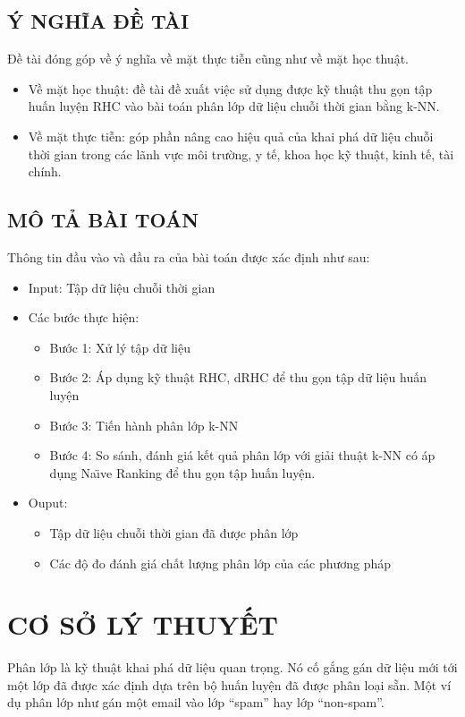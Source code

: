 \documentclass[13pt,oneside]{scrbook}
\begin{document}
\section{Ý NGHĨA ĐỀ TÀI}
Đề tài đóng góp về ý nghĩa về mặt thực tiễn cũng như về mặt học thuật.
\begin{itemize}
\item Về mặt học thuật: đề tài đề xuất việc sử dụng được kỹ thuật thu gọn tập huấn luyện RHC vào bài toán phân lớp dữ liệu chuỗi thời gian bằng k-NN.

\item Về mặt thực tiễn: góp phần nâng cao hiệu quả của khai phá dữ liệu chuỗi thời gian trong các lãnh vực môi trường, y tế, khoa học kỹ thuật, kinh tế, tài chính.
\end{itemize}

\section{MÔ TẢ BÀI TOÁN}
Thông tin đầu vào và đầu ra của bài toán được xác định như sau:
\begin{itemize}
\item Input: Tập dữ liệu chuỗi thời gian
\item Các bước thực hiện:
\begin{itemize}
\item Bước 1: Xử lý tập dữ liệu
\item Bước 2: Áp dụng kỹ thuật RHC, dRHC để thu gọn tập dữ liệu huấn luyện
\item Bước 3: Tiến hành phân lớp k-NN
\item Bước 4: So sánh, đánh giá kết quả phân lớp với giải thuật k-NN có áp dụng Na{\"\i}ve Ranking để thu gọn tập huấn luyện.
\end{itemize}
\item Ouput:
\begin{itemize}
\item Tập dữ liệu chuỗi thời gian đã được phân lớp
\item Các độ đo đánh giá chất lượng phân lớp của các phương pháp
\end{itemize}

\end{itemize}
\newpage
\chapter{CƠ SỞ LÝ THUYẾT}\label{Sec:Phan2}
Phân lớp là kỹ thuật khai phá dữ liệu quan trọng. Nó cố gắng gán dữ liệu mới tới một lớp đã được xác định dựa trên bộ huấn luyện đã được phân loại sẵn. 
Một ví dụ phân lớp như gán một email vào lớp “spam” hay lớp “non-spam”.
\end{document}
